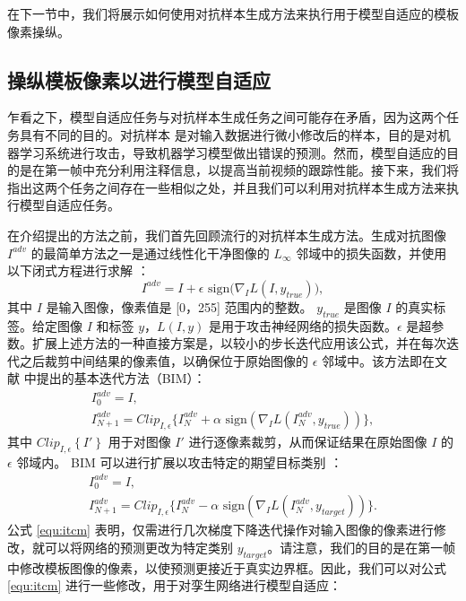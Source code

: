 在下一节中，我们将展示如何使用对抗样本生成方法来执行用于模型自适应的模板像素操纵。

\subsection{操纵模板像素以进行模型自适应}
乍看之下，模型自适应任务与对抗样本生成任务之间可能存在矛盾，因为这两个任务具有不同的目的。对抗样本 \cite{kurakin2017adversarial} 是对输入数据进行微小修改后的样本，目的是对机器学习系统进行攻击，导致机器学习模型做出错误的预测。然而，模型自适应的目的是在第一帧中充分利用注释信息，以提高当前视频的跟踪性能。接下来，我们将指出这两个任务之间存在一些相似之处，并且我们可以利用对抗样本生成方法来执行模型自适应任务。

在介绍提出的方法之前，我们首先回顾流行的对抗样本生成方法。生成对抗图像 $I^{adv}$ 的最简单方法之一是通过线性化干净图像的 $L_{\infty}$ 邻域中的损失函数，并使用以下闭式方程进行求解 \cite{FGSM}：
\begin{equation}
    I^{adv} = I + \epsilon \text{ sign} \bigl( \nabla_I L(I, y_{true})  \bigr),
\end{equation}
其中 $I$ 是输入图像，像素值是 [0，255] 范围内的整数。 $y_{true}$ 是图像 $I$ 的真实标签。给定图像 $I$ 和标签 $y$，$L(I, y)$ 是用于攻击神经网络的损失函数。$\epsilon$ 是超参数。扩展上述方法的一种直接方案是，以较小的步长迭代应用该公式，并在每次迭代之后裁剪中间结果的像素值，以确保位于原始图像的 $\epsilon$ 邻域中。该方法即在文献 \cite{kurakin2017adversarial} 中提出的基本迭代方法（BIM）：
\begin{equation}
    \begin{gathered}
        I_0^{adv} = I, \\
        I_{N+1}^{adv} = Clip_{I,\epsilon}\{I_N^{adv}+\alpha \text{ sign}(\nabla_I L(I_N^{adv},y_{true}))\},
    \end{gathered}
\end{equation}
其中 $Clip_{I, \epsilon} \left\{ I' \right\}$ 用于对图像 $I'$ 进行逐像素裁剪，从而保证结果在原始图像 $I$ 的 $\epsilon$ 邻域内。
BIM 可以进行扩展以攻击特定的期望目标类别 \cite{kurakin2017adversarial}：
\begin{equation}
    \begin{gathered}
        I_0^{adv} = I,\\
        I_{N+1}^{adv} = Clip_{I,\epsilon}\{I_N^{adv}-\alpha \text{ sign}(\nabla_I L(I_N^{adv},y_{target}))\}.
    \end{gathered}
    \label{equ:itcm}
\end{equation}
公式 \ref{equ:itcm} 表明，仅需进行几次梯度下降迭代操作对输入图像的像素进行修改，就可以将网络的预测更改为特定类别 $y_{target}$。请注意，我们的目的是在第一帧中修改模板图像的像素，以使预测更接近于真实边界框。因此，我们可以对公式 \ref{equ:itcm} 进行一些修改，用于对孪生网络进行模型自适应：
